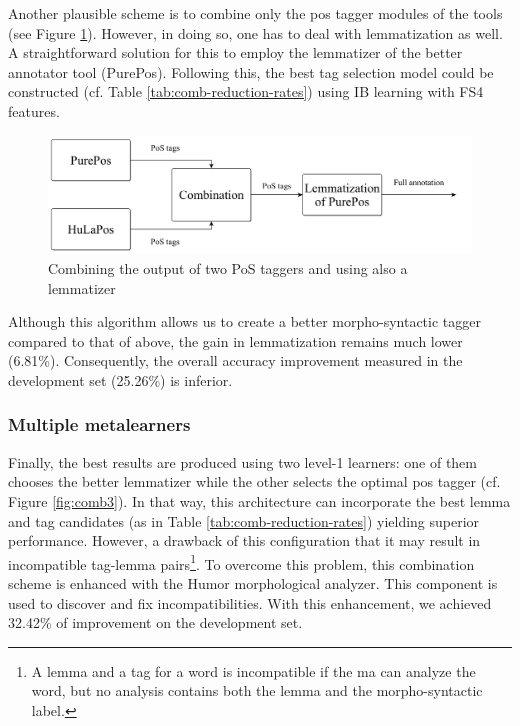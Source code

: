 Another plausible scheme is to combine only the \acrshort{pos} tagger modules of the tools (see Figure \ref{fig:comb2}).
However, in doing so, one has to deal with lemmatization as well.
A straightforward solution for this to employ the lemmatizer of the better annotator tool (PurePos).
Following this, the best tag selection model could be constructed (cf.
Table \ref{tab:comb-reduction-rates}) using IB learning with FS4 features.

\begin{figure}[H]
  \centering
  \includegraphics[scale=0.2]{MorphTagging/comb2.png} 
  \caption{Combining the output of two PoS taggers and using also a lemmatizer}
  \label{fig:comb2}
\end{figure}

Although this algorithm allows us to create a better morpho-syntactic tagger compared to that of above, the gain in lemmatization remains much lower (6.81\%).
Consequently, the overall accuracy improvement measured in the development set (25.26\%) is inferior.

\subsubsection{Multiple metalearners}

Finally, the best results are produced using two level-1 learners: one of them chooses the better lemmatizer while the other selects the optimal \acrshort{pos} tagger (cf. Figure \ref{fig:comb3}).
In that  way, this architecture can incorporate the best lemma and tag candidates (as in Table \ref{tab:comb-reduction-rates}) yielding superior performance.
However, a drawback of this configuration that it may result in incompatible tag-lemma pairs\footnote{A lemma and a tag for a word is incompatible if the \acrshort{ma} can analyze the word, but no analysis contains both the lemma and the morpho-syntactic label.}.
To overcome this problem, this combination scheme is enhanced with the Humor morphological analyzer.
This component is used to discover and fix incompatibilities.
With this enhancement, we achieved  32.42\% of improvement on the development set.


